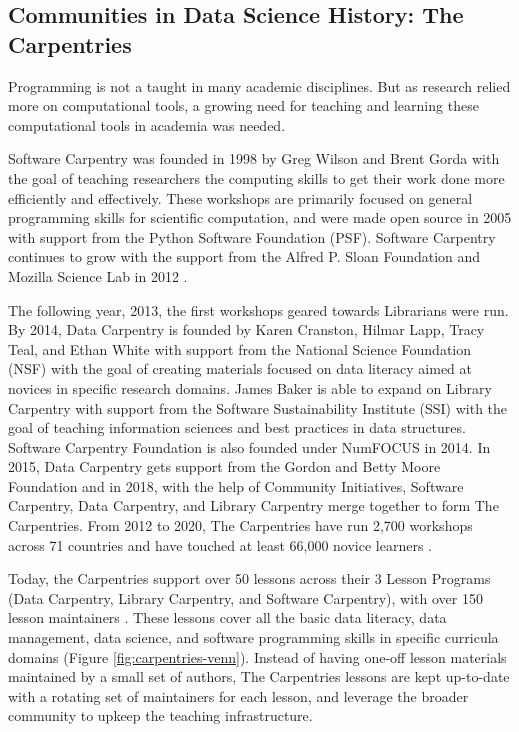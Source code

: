 \documentclass[010-intro.tex]{subfiles}
\begin{document}
    \subsection{Communities in Data Science History: The Carpentries}
    
        Programming is not a taught in many academic disciplines.
        But as research relied more on computational tools,
        a growing need for teaching and learning these computational tools in academia was needed.

        Software Carpentry was founded in 1998 by Greg Wilson and Brent Gorda with the goal of
        teaching researchers the computing skills to get their work done more efficiently and effectively.
        These workshops are primarily focused on general programming skills for scientific computation,
        and were made open source in 2005 with support from the Python Software Foundation (PSF).
        Software Carpentry continues to grow with the support from the Alfred P. Sloan Foundation and Mozilla Science Lab in 2012
        \cite{CarpentriesHowWe, jordanCarpentries2020Annual}.


        The following year, 2013, the first workshops geared towards Librarians were run.
        By 2014, Data Carpentry is founded by Karen Cranston, Hilmar Lapp, Tracy Teal, and Ethan White
        with support from the National Science Foundation (NSF)
        with the goal of creating materials focused on data literacy aimed at novices in specific research domains.
        James Baker is able to expand on Library Carpentry with support from the Software Sustainability Institute (SSI)
        with the goal of teaching information sciences and best practices in data structures.
        Software Carpentry Foundation is also founded under NumFOCUS in 2014.
        In 2015, Data Carpentry gets support from the Gordon and Betty Moore Foundation and
        in 2018, with the help of Community Initiatives, Software Carpentry, Data Carpentry, and Library Carpentry
        merge together to form The Carpentries.
        From 2012 to 2020, The Carpentries have run
        2,700 workshops across 71 countries and have touched at least 66,000 novice learners
        \cite{CarpentriesHowWe, jordanCarpentries2020Annual}.
        
        Today, the Carpentries support over 50 lessons across their 3 Lesson Programs
        (Data Carpentry, Library Carpentry, and Software Carpentry),
        with over 150 lesson maintainers
        \cite{chenPointContactEach}.
        These lessons cover all the basic data literacy, data management, data science, and software programming
        skills in specific curricula domains (Figure \ref{fig:carpentries-venn}).
        Instead of having one-off lesson materials maintained by a small set of authors,
        The Carpentries lessons are kept up-to-date with a rotating set of maintainers for each lesson,
        and leverage the broader community to upkeep the teaching infrastructure.
        
\end{document}
